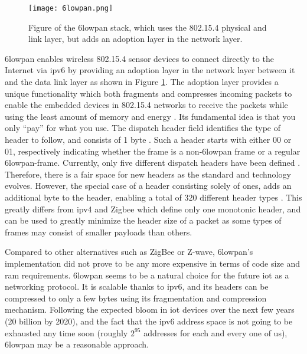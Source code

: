 \begin{figure}[h]
	\centering
	\texttt{[image: 6lowpan.png]}
	\caption{Figure of the \gls{6lowpan} stack, which uses the 802.15.4 physical and link layer, but adds an adoption layer in the network layer.}
	\label{fig:6lowpan-stack}
\end{figure}

\gls{6lowpan} enables wireless 802.15.4 sensor devices to connect directly to the Internet via \gls{ip}v6 by providing an adoption layer in the network layer between it and the data link layer as shown in Figure \ref{fig:6lowpan-stack}. The adoption layer provides a unique functionality which both fragments and compresses incoming packets to enable the embedded devices in 802.15.4 networks to receive the packets while using the least amount of memory and energy \cite{krentz20136lowpan}. Its fundamental idea is that you only ``pay'' for what you use. The dispatch header field identifies the type of header to follow, and consists of 1 byte \citep{Mulligan2007}. Such a header starts with either 00 or 01, respectively indicating whether the frame is a non-\gls{6lowpan} frame or a regular \gls{6lowpan}-frame. Currently, only five different dispatch headers have been defined \cite{rfc6282}. Therefore, there is a fair space for new headers as the standard and technology evolves. However, the special case of a header consisting solely of ones, adds an additional byte to the header, enabling a total of 320 different header types \citep{Mulligan2007}. This greatly differs from \gls{ip}v4 and Zigbee which define only one monotonic header, and can be used to greatly minimize the header size of a packet as some types of frames may consist of smaller payloads than others.


Compared to other alternatives such as ZigBee or Z-wave, \gls{6lowpan}'s implementation did not prove to be any more expensive in terms of code size and \gls{ram} requirements. \gls{6lowpan} seems to be a natural choice for the future \gls{iot} as a networking protocol. It is scalable thanks to \gls{ip}v6, and its headers can be compressed to only a few bytes using its fragmentation and compression mechanism. Following the expected bloom in \gls{iot} devices over the next few years (20 billion by 2020), and the fact that the \gls{ip}v6 address space is not going to be exhausted any time soon (roughly $2^{95}$ addresses for each and every one of us), \gls{6lowpan} may be a reasonable approach.



